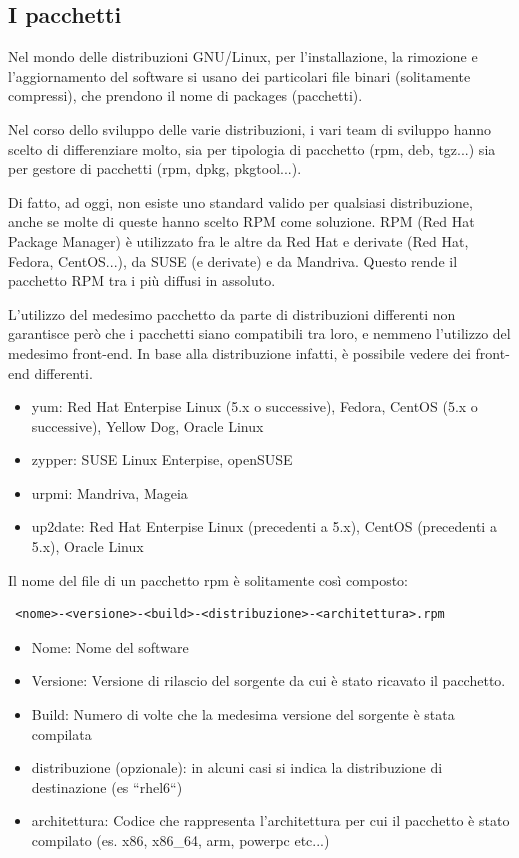 \subsection{I pacchetti}

Nel mondo delle distribuzioni GNU/Linux, per l'installazione, la rimozione e l'aggiornamento del software si usano dei particolari file binari (solitamente compressi), che prendono il nome di packages (pacchetti).

Nel corso dello sviluppo delle varie distribuzioni, i vari team di sviluppo hanno scelto di differenziare molto, sia per tipologia di pacchetto (rpm, deb, tgz...) sia per gestore di pacchetti (rpm, dpkg, pkgtool...).

Di fatto, ad oggi, non esiste uno standard valido per qualsiasi distribuzione, anche se molte di queste hanno scelto RPM come soluzione. RPM (Red Hat Package Manager) è utilizzato fra le altre da Red Hat e derivate (Red Hat, Fedora, CentOS...), da SUSE (e derivate) e da Mandriva. Questo rende il pacchetto RPM tra i più diffusi in assoluto. 

L'utilizzo del medesimo pacchetto da parte di distribuzioni differenti non garantisce però che i pacchetti siano compatibili tra loro, e nemmeno l'utilizzo del medesimo front-end. In base alla distribuzione infatti, è possibile vedere dei front-end differenti.

\begin{itemize}
 \item yum: Red Hat Enterpise Linux (5.x o successive), Fedora, CentOS (5.x o successive), Yellow Dog, Oracle Linux
 \item zypper: SUSE Linux Enterpise, openSUSE
 \item urpmi: Mandriva, Mageia
 \item up2date: Red Hat Enterpise Linux (precedenti a 5.x), CentOS (precedenti a 5.x), Oracle Linux
\end{itemize}

Il nome del file di un pacchetto rpm è solitamente così composto:

\begin{verbatim}
 <nome>-<versione>-<build>-<distribuzione>-<architettura>.rpm
\end{verbatim}

\begin{itemize}
 \item Nome: Nome del software
 \item Versione: Versione di rilascio del sorgente da cui è stato ricavato il pacchetto.
 \item Build: Numero di volte che la medesima versione del sorgente è stata compilata
 \item distribuzione (opzionale): in alcuni casi si indica la distribuzione di destinazione (es ``rhel6``)
 \item architettura: Codice che rappresenta l'architettura per cui il pacchetto è stato compilato (es. x86, x86\_64, arm, powerpc etc...)
\end{itemize}

